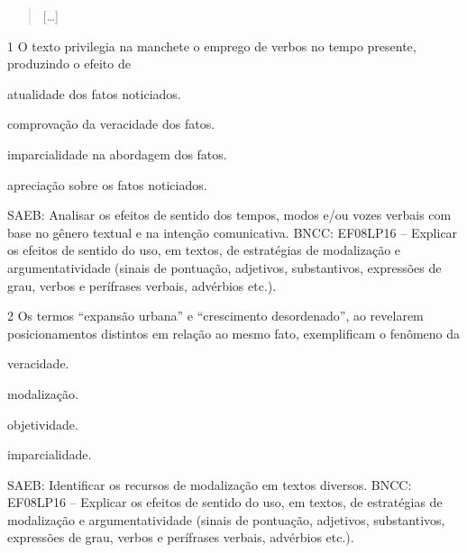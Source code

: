 \begin{quote}
{[}\ldots{]}
\end{quote}


\num{1} O texto privilegia na manchete o emprego de verbos no tempo
presente, produzindo o efeito de

\begin{escolha}
\item atualidade dos fatos noticiados.

\item comprovação da veracidade dos fatos.

\item imparcialidade na abordagem dos fatos.

\item apreciação sobre os fatos noticiados.
\end{escolha}

SAEB: Analisar os efeitos de sentido dos tempos, modos e/ou vozes
verbais com base no gênero textual e na intenção comunicativa. BNCC:
EF08LP16 -- Explicar os efeitos de sentido do uso, em textos, de
estratégias de modalização e argumentatividade (sinais de pontuação,
adjetivos, substantivos, expressões de grau, verbos e perífrases
verbais, advérbios etc.).

\num{2} Os termos ``expansão urbana'' e ``crescimento desordenado'', ao
revelarem posicionamentos distintos em relação ao mesmo fato,
exemplificam o fenômeno da

\begin{escolha}
\item veracidade.

\item modalização.

\item objetividade.

\item imparcialidade.
\end{escolha}

SAEB: Identificar os recursos de modalização em textos diversos. BNCC:
EF08LP16 -- Explicar os efeitos de sentido do uso, em textos, de
estratégias de modalização e argumentatividade (sinais de pontuação,
adjetivos, substantivos, expressões de grau, verbos e perífrases
verbais, advérbios etc.).

